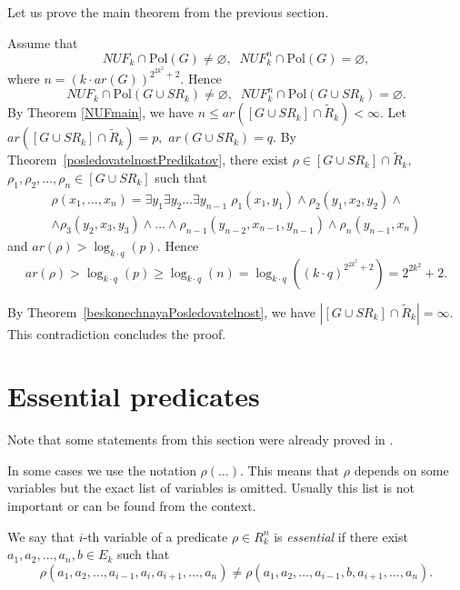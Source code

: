 \documentclass{au}
\theoremstyle{plain}
\theoremstyle{definition}
\theoremstyle{remark}
\numberwithin{equation}{section}
\newenvironment{Proof}[1][]
{ 
  \trivlist
  \item[\hskip\labelsep\itshape{\it Proof#1.}]\ignorespaces
}{ 
  \endtrivlist \par
}
\begin{document}
Let us prove the main theorem from the previous section.
\begin{Proof} [ of Theorem \ref{maintheorem}]

Assume that
$$NUF_{k}\cap {
\mathrm{Pol}
}(G)\neq \varnothing,\;\;
NUF_{k}^{n}\cap {
\mathrm{Pol}
}(G)= \varnothing,$$
where $n = (k\cdot ar(G))^{2^{2k^{2}}+2}.$
Hence
$$NUF_{k}\cap {
\mathrm{Pol}
}(G\cup SR_{k})\neq \varnothing,\;\;
NUF_{k}^{n}\cap {
\mathrm{Pol}
}(G\cup SR_{k})= \varnothing.$$
By Theorem \ref{NUFmain},
we have
$
n \le ar([G\cup SR_{k}]\cap \widetilde R_{k})<\infty.$
Let $ar([G\cup SR_{k}]\cap \widetilde R_{k})=p,$
$ar(G\cup SR_{k})=q.$
By Theorem~\ref{posledovatelnostPredikatov},
there exist $\rho \in [G\cup SR_{k}]\cap \widetilde R_{k},$
$\rho_{1},\rho_{2},\ldots,\rho_{n}\in [G\cup SR_{k}]$
such that
\begin{multline*}\rho(x_{1},\ldots,x_{n}) = \exists y_{1}\exists y_{2}\ldots\exists y_{n-1}\;
\rho_{1}(x_{1},y_{1})\wedge
\rho_{2}(y_{1},x_{2},y_{2})\wedge \\ \wedge
\rho_{3}(y_{2},x_{3},y_{3})\wedge \ldots \wedge
\rho_{n-1}(y_{n-2},x_{n-1},y_{n-1})\wedge
\rho_{n}(y_{n-1},x_{n})
\end{multline*}
and
$ar(\rho)>\log_{k\cdot q}(p).$
Hence
$$ar(\rho)>\log_{k\cdot q}(p)\ge \log_{k\cdot q}(n)=
\log_{k\cdot q}((k\cdot q)^{2^{2k^{2}}+2}) = 2^{2k^{2}}+2.$$

By Theorem~\ref{beskonechnayaPosledovatelnost},
we have $|[G\cup SR_{k}] \cap \widetilde R_{k}| = \infty.$
This contradiction concludes the proof.

\end{Proof} 

\section{Essential predicates}
Note that some statements from this section were already proved in \cite{mydm, mybook,Minimal_Clones}.

In some cases we use the notation $\rho(\ldots).$
This means that $\rho$ depends on some variables but the exact list of variables is omitted.
Usually this list is not important or can be found from the context.

We say that $i$-th variable of a predicate $\rho\in R_{k}^{n}$ is \emph{essential} if
there exist $a_{1},a_{2},\ldots,a_{n},b\in E_{k}$
such that
$$\rho(a_{1},a_{2},\ldots,a_{i-1},a_{i},a_{i+1},\ldots, a_{n}) \neq
\rho(a_{1},a_{2},\ldots,a_{i-1},b,a_{i+1},\ldots, a_{n}).$$
\end{document}
